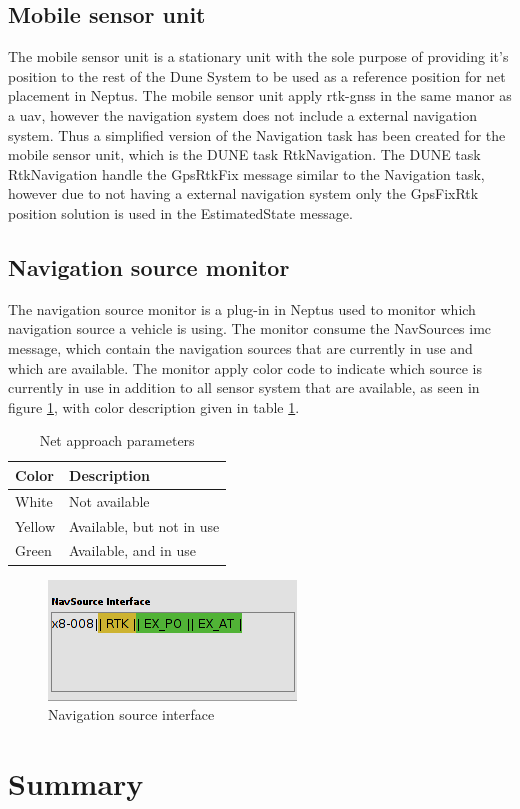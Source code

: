 \subsection{Mobile sensor unit}
The mobile sensor unit is a stationary unit with the sole purpose of providing it's position to the rest of the Dune System to be used as a reference position for net placement in Neptus. The mobile sensor unit apply \gls{rtk-gnss} in the same manor as a \gls{uav}, however the navigation system does not include a external navigation system. Thus a simplified version of the Navigation task has been created for the mobile sensor unit, which is the DUNE task RtkNavigation. The DUNE task RtkNavigation handle the GpsRtkFix message similar to the Navigation task, however due to not having a external navigation system only the GpsFixRtk position solution is used in the EstimatedState message.
\subsection{Navigation source monitor}
The navigation source monitor is a plug-in in Neptus used to monitor which navigation source a vehicle is using. The monitor consume the NavSources \gls{imc} message, which contain the navigation sources that are currently in use and which are available. The monitor apply color code to indicate which source is currently in use in addition to all sensor system that are available, as seen in figure \ref{Fig:NavsourceInterface}, with color description given in table \ref{Tb:Color Code}.
\begin{table}[H]
\begin{center}
    \begin{tabular}{ | l | l |}
    \hline
    \textbf{Color} & \textbf{Description} \\ \hline
    White & Not available \\ \hline
    Yellow & Available, but not in use \\ \hline
    Green & Available, and in use \\ \hline
    \end{tabular}
\end{center}
\caption{Net approach parameters }
\label{Tb:Color Code}
\end{table}
\begin{figure}[H]
\centering
\includegraphics[scale=0.6]{figs/NavSourceInterface.png}
\caption{Navigation source interface}
\label{Fig:NavsourceInterface}
\end{figure}
\section{Summary}